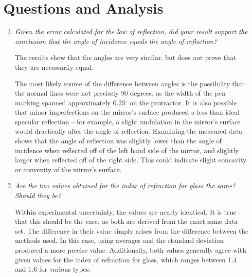 \documentclass[twocolumn,english]{IEEEtran}
\theoremstyle{plain}
\theoremstyle{plain}
\begin{document}
\section{Questions and Analysis}
\begin{enumerate}
	\item
		\textit{Given the error calculated for the law of reflection, did your result support the conclusion that the angle of incidence equals the angle of reflection?}

		The results show that the angles are very similar, but does not prove that they are necessarily equal.

		The most likely source of the difference between angles is the possibility that the normal lines were not precisely 90 degrees, as the width of the pen marking spanned approximately 0.25$^{\circ}$ on the protractor. It is also possible that minor imperfections on the mirror's surface produced a less than ideal specular reflection -- for example, a slight undulation in the mirror's surface would drastically alter the angle of reflection. Examining the measured data shows that the angle of reflection was slightly lower than the angle of incidence when reflected off of the left hand side of the mirror, and slightly larger when reflected off of the right side. This could indicate slight concavity or convexity of the mirror's surface.
	\item
		\textit{Are the two values obtained for the index of refraction for glass the same? Should they be?}

		Within experimental uncertainty, the values are nearly identical. It is true that this should be the case, as both are derived from the exact same data set. The difference in their value simply arises from the difference between the methods used. In this case, using averages and the standard deviation produced a more precise value. Additionally, both values generally agree with given values for the index of refraction for glass, which ranges between 1.4 and 1.6 for various types.
\end{enumerate}

%
%
\end{document}
